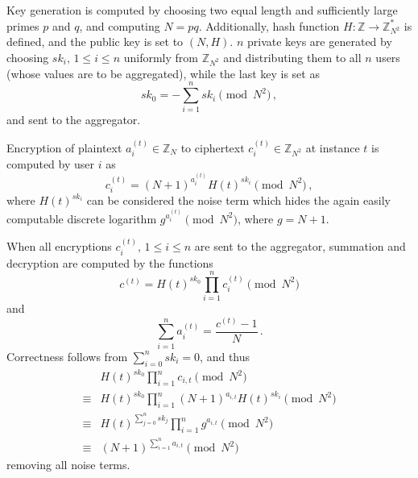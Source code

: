 \documentclass[10pt,letterpaper,oneside,twocolumn,journal]{IEEEtran}
\theoremstyle{definition}
\theoremstyle{definition}
\theoremstyle{remark}
\begin{document}
Key generation is computed by choosing two equal length and sufficiently large primes $p$ and $q$, and computing $N=pq$. Additionally, hash function $H:\mathbb{Z} \rightarrow \mathbb{Z}_{N^2}^*$ is defined, and the public key is set to $(N, H)$. $n$ private keys are generated by choosing $sk_i,\,1\leq i\leq n$ uniformly from $\mathbb{Z}_{N^2}$ and distributing them to all $n$ users (whose values are to be aggregated), while the last key is set as
\begin{equation}
    sk_0 = -\sum^{n}_{i=1}sk_i \pmod{N^2}\,,
\end{equation}
and sent to the aggregator.

Encryption of plaintext $a^{(t)}_{i} \in \mathbb{Z}_N$ to ciphertext $c^{(t)}_{i} \in \mathbb{Z}_{N^2}$ at instance $t$ is computed by user $i$ as
\begin{equation}
    c^{(t)}_{i} = (N+1)^{a^{(t)}_{i}} H(t)^{sk_i} \pmod{N^2}\,,
\end{equation}
where $H(t)^{sk_i}$ can be considered the noise term which hides the again easily computable discrete logarithm $g^{a^{(t)}_{i}} \pmod{N^2}$, where $g=N+1$.

When all encryptions $c^{(t)}_{i},\,1\leq i \leq n$ are sent to the aggregator, summation and decryption are computed by the functions
\begin{equation}
    c^{(t)} = H(t)^{sk_0}\prod^{n}_{i=1}c^{(t)}_{i} \pmod{N^2}
\end{equation}
and
\begin{equation}
    \sum^{n}_{i=1}a^{(t)}_{i} = \frac{c^{(t)}-1}{N}\,. \label{eqn:agg_decryption}
\end{equation}
Correctness follows from $\sum^{n}_{i=0}sk_i = 0$, and thus
\begin{equation*}
    \begin{split}
        &H(t)^{sk_0}\prod^{n}_{i=1}c_{i,t} \pmod{N^2} \\
        \equiv &H(t)^{sk_0}\prod^{n}_{i=1}(N+1)^{a_{i,t}} H(t)^{sk_i} \pmod{N^2} \\
        \equiv &H(t)^{\sum^n_{j=0}sk_j} \prod^{n}_{i=1}g^{a_{i,t}} \pmod{N^2} \\
        \equiv &(N+1)^{\sum^n_{i=1}a_{i,t}} \pmod{N^2}
    \end{split}
\end{equation*}
removing all noise terms.
\end{document}
